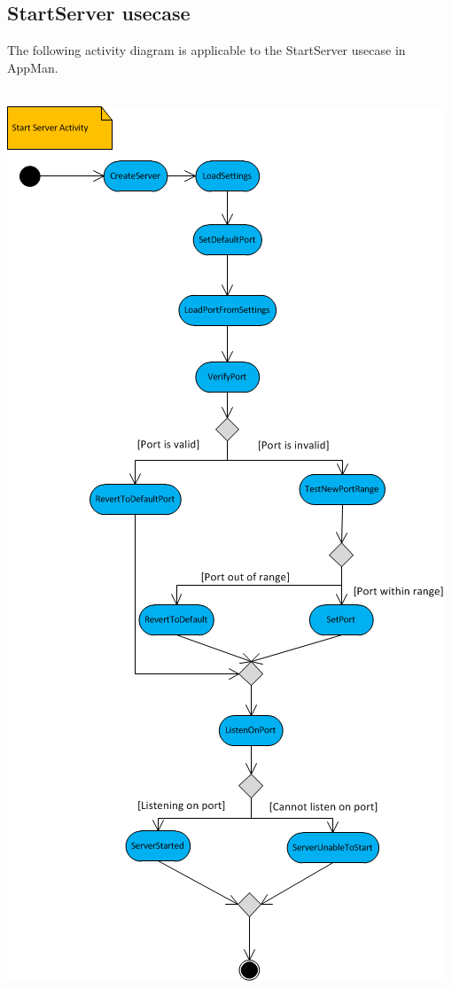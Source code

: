 \documentclass[a4paper,12pt,final]{article}
\begin{document}
\subsection{StartServer usecase}
The following activity diagram is applicable to the StartServer usecase in AppMan.\\
\textbf{\\}
\begin{center}
\includegraphics[scale=0.8]{StartServer.png}
\end{center}
\end{document}
